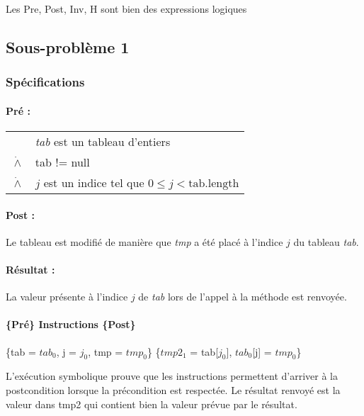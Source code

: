 
Les Pre, Post, Inv, H sont bien des expressions logiques

\subsection{Sous-problème 1}

\subsubsection{Spécifications}

\paragraph{Pré :}

\begin{tabular}{ll}
  & \textit{tab} est un tableau d'entiers \\
  $\dot{\wedge}$ & tab != null \\
  $\dot{\wedge}$ & $j$ est un indice tel que $0 \le j < \mathrm{tab.length}$
\end{tabular}

\paragraph{Post :}

Le tableau est modifié de manière que \textit{tmp} a été placé à l'indice $j$ du tableau \textit{tab}.

\paragraph{Résultat :}

La valeur présente à l'indice $j$ de \textit{tab} lors de l'appel à la méthode est renvoyée.

\paragraph{ \{Pré\} Instructions \{Post\} }

\{tab = $tab_{0}$, j = $j_{0}$, tmp = $tmp_{0}$\}
\{$tmp2_{1}$ = tab[$j_{0}$], $tab_{0}$[j] = $tmp_{0}$\}

L'exécution symbolique prouve que les instructions permettent d'arriver à la postcondition lorsque la précondition est respectée. Le résultat renvoyé est la valeur dans tmp2 qui contient bien la valeur prévue par le résultat.

